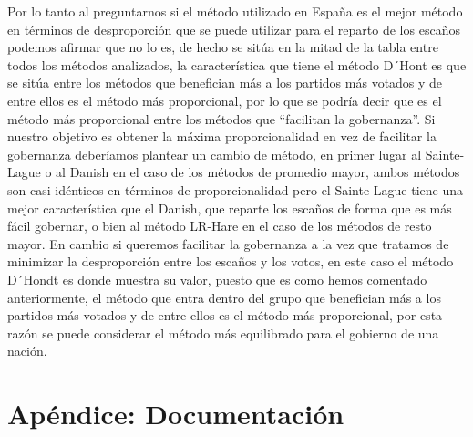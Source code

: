 \documentclass[12pt,a4paper,]{book}
\def\ifdoblecara{} %
\def\ifprincipal{} %
\numberwithin{dummy}{section}
\theoremstyle{ocrenumbox}
\theoremstyle{blacknumex}
\theoremstyle{blacknumbox}
\theoremstyle{ocrenum}
\theoremstyle{ocrenum}
\begin{document}
Por lo tanto al preguntarnos si el método utilizado en España es el
mejor método en términos de desproporción que se puede utilizar para el
reparto de los escaños podemos afirmar que no lo es, de hecho se sitúa
en la mitad de la tabla entre todos los métodos analizados, la
característica que tiene el método D´Hont es que se sitúa entre los
métodos que benefician más a los partidos más votados y de entre ellos
es el método más proporcional, por lo que se podría decir que es el
método más proporcional entre los métodos que ``facilitan la
gobernanza''. Si nuestro objetivo es obtener la máxima proporcionalidad
en vez de facilitar la gobernanza deberíamos plantear un cambio de
método, en primer lugar al Sainte-Lague o al Danish en el caso de los
métodos de promedio mayor, ambos métodos son casi idénticos en términos
de proporcionalidad pero el Sainte-Lague tiene una mejor característica
que el Danish, que reparte los escaños de forma que es más fácil
gobernar, o bien al método LR-Hare en el caso de los métodos de resto
mayor. En cambio si queremos facilitar la gobernanza a la vez que
tratamos de minimizar la desproporción entre los escaños y los votos, en
este caso el método D´Hondt es donde muestra su valor, puesto que es
como hemos comentado anteriormente, el método que entra dentro del grupo
que benefician más a los partidos más votados y de entre ellos es el
método más proporcional, por esta razón se puede considerar el método
más equilibrado para el gobierno de una nación.

\FloatBarrier

\appendix

\ifdefined\ifprincipal
\else
\setlength{\parindent}{1em}
\pagestyle{fancy}
\setcounter{tocdepth}{4}
\tableofcontents

\fi

\ifdefined\ifdoblecara
\fancyhead{}{}
\fancyhead[LE,RO]{\scriptsize\rightmark}
\fancyfoot[LO,RE]{\scriptsize\slshape \leftmark}
\fancyfoot[C]{}
\fancyfoot[LE,RO]{\footnotesize\thepage}
\else
\fancyhead{}{}
\fancyhead[RO]{\scriptsize\rightmark}
\fancyfoot[LO]{\scriptsize\slshape \leftmark}
\fancyfoot[C]{}
\fancyfoot[RO]{\footnotesize\thepage}
\fi
\renewcommand{\headrulewidth}{0.4pt}
\renewcommand{\footrulewidth}{0.4pt}

\hypertarget{apuxe9ndice-documentaciuxf3n}{%
\chapter{Apéndice: Documentación}\label{apuxe9ndice-documentaciuxf3n}}
\end{document}
